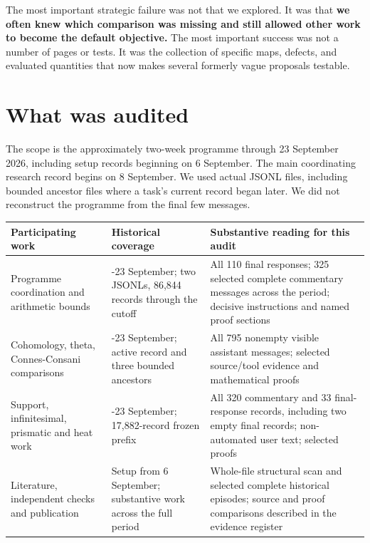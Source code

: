 \documentclass[
  british,
  11pt,
  a4paper,
]{article}
\newcounter{none} %
\begin{document}
The most important strategic failure was not that we explored. It was
that \textbf{we often knew which comparison was missing and still
allowed other work to become the default objective.} The most important
success was not a number of pages or tests. It was the collection of
specific maps, defects, and evaluated quantities that now makes several
formerly vague proposals testable.

\section{What was audited}\label{what-was-audited}

The scope is the approximately two-week programme through 23 September
2026, including setup records beginning on 6 September. The main
coordinating research record begins on 8 September. We used actual JSONL
files, including bounded ancestor files where a task's current record
began later. We did not reconstruct the programme from the final few
messages.

{\def\LTcaptype{none} %
\begin{longtable}[]{@{}
  >{\raggedright\arraybackslash}p{}
  >{\raggedright\arraybackslash}p{}
  >{\raggedright\arraybackslash}p{}@{}}
\toprule\noalign{}
\begin{minipage}[b]{\linewidth}\raggedright
Participating work
\end{minipage} & \begin{minipage}[b]{\linewidth}\raggedright
Historical coverage
\end{minipage} & \begin{minipage}[b]{\linewidth}\raggedright
Substantive reading for this audit
\end{minipage} \\
\midrule\noalign{}
\endhead
\bottomrule\noalign{}
\endlastfoot
Programme coordination and arithmetic bounds & 8-23 September; two
JSONLs, 86,844 records through the cutoff & All 110 final responses; 325
selected complete commentary messages across the period; decisive
instructions and named proof sections \\
Cohomology, theta, Connes-Consani comparisons & 13-23 September; active
record and three bounded ancestors & All 795 nonempty visible assistant
messages; selected source/tool evidence and mathematical proofs \\
Support, infinitesimal, prismatic and heat work & 19-23 September;
17,882-record frozen prefix & All 320 commentary and 33 final-response
records, including two empty final records; non-automated user text;
selected proofs \\
Literature, independent checks and publication & Setup from 6 September;
substantive work across the full period & Whole-file structural scan and
selected complete historical episodes; source and proof comparisons
described in the evidence register \\
\end{longtable}
}
\end{document}
